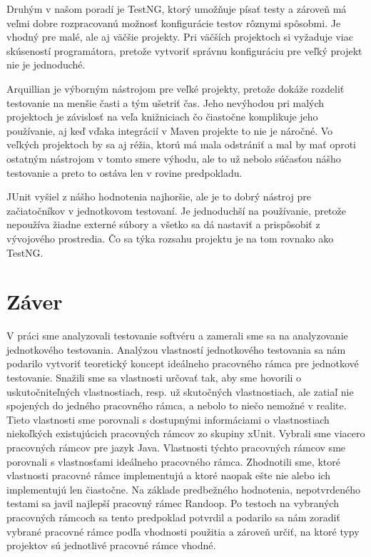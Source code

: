 \documentclass[11pt,twoside,slovak,a4paper]{article}
\begin{document}
	Druhým v našom poradí je TestNG, ktorý umožňuje písať testy a zároveň má veľmi dobre rozpracovanú možnosť konfigurácie testov rôznymi spôsobmi. Je vhodný pre malé, ale aj väčšie projekty. Pri väčších projektoch si vyžaduje viac skúseností programátora, pretože vytvoriť správnu konfiguráciu pre veľký projekt nie je jednoduché.
	
	Arquillian je výborným nástrojom pre veľké projekty, pretože dokáže rozdeliť testovanie na menšie časti a tým ušetriť čas. Jeho nevýhodou pri malých projektoch je závislosť na veľa knižniciach čo čiastočne komplikuje jeho používanie, aj keď vďaka integrácií v Maven projekte to nie je náročné. Vo veľkých projektoch by sa aj réžia, ktorú má mala odstrániť a mal by mať oproti ostatným nástrojom v tomto smere výhodu, ale to už nebolo súčasťou nášho testovanie a preto to ostáva len v rovine predpokladu.
	
	JUnit vyšiel z nášho hodnotenia najhoršie, ale je to dobrý nástroj pre začiatočníkov v jednotkovom testovaní. Je jednoduchší na používanie, pretože nepoužíva žiadne externé súbory a všetko sa dá nastaviť a prispôsobiť z vývojového prostredia. Čo sa týka rozsahu projektu je na tom rovnako ako TestNG.
	
	\newpage
 	\thispagestyle{plain}
	\section{Záver}
	V práci sme analyzovali testovanie softvéru a zamerali sme sa na analyzovanie jednotkového testovania. Analýzou vlastností jednotkového testovania sa nám podarilo vytvoriť teoretický koncept ideálneho pracovného rámca pre jednotkové testovanie. Snažili sme sa vlastnosti určovať tak, aby sme hovorili o uskutočniteľných vlastnostiach, resp. už skutočných vlastnostiach, ale zatiaľ nie spojených do jedného pracovného rámca, a nebolo to niečo nemožné v realite. Tieto vlastnosti sme porovnali s dostupnými informáciami o vlastnostiach niekoľkých existujúcich pracovných rámcov zo skupiny xUnit. Vybrali sme viacero pracovných rámcov pre jazyk Java. Vlastnosti týchto pracovných rámcov sme porovnali s vlastnosťami ideálneho pracovného rámca. Zhodnotili sme, ktoré vlastnosti pracovné rámce implementujú a ktoré naopak ešte nie alebo ich implementujú len čiastočne. Na základe predbežného hodnotenia, nepotvrdeného testami sa javil najlepší pracovný rámec Randoop. Po testoch na vybraných pracovných rámcoch sa tento predpoklad potvrdil a podarilo sa nám zoradiť vybrané pracovné rámce podľa vhodnosti použitia a zároveň určiť, na ktoré typy projektov sú jednotlivé pracovné rámce vhodné.
	
\end{document}
